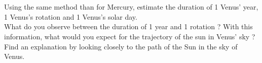 \documentclass{article}
\begin{document}
\section{}

Using the same method than for Mercury, estimate the duration of 1 Venus' year, 1 Venus's rotation and 1 Venus's solar day.\\
What do you observe between the duration of 1 year and 1 rotation ? With this information, what would you expect for the trajectory of the sun in Venus' sky ?\\
Find an explanation by looking closely to the path of the Sun in the sky of Venus.
\end{document}

